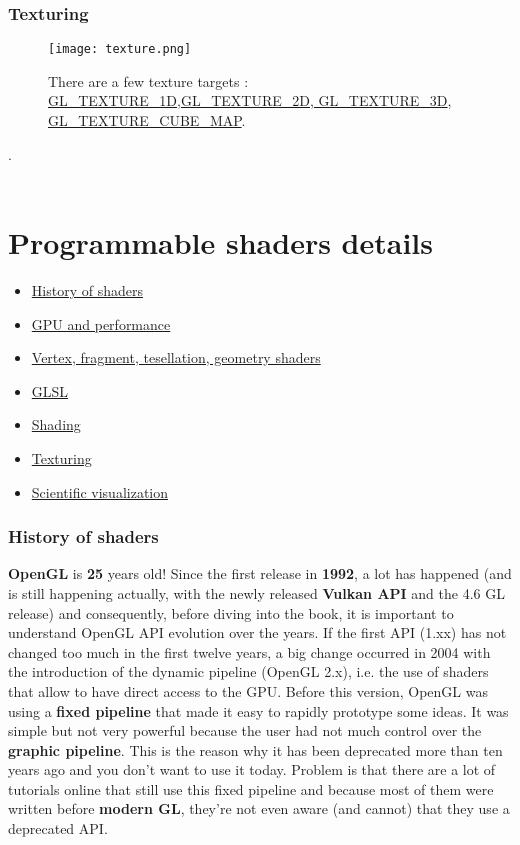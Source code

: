 \documentclass[onecolumn]{article}
\begin{document}
\subsubsection{Texturing }\label{sec:1.0.4}

\begin{figure}[ht!]
\centering
\texttt{[image: texture.png]}
\caption{There are a few texture targets : \url{GL_TEXTURE_1D},\url{GL_TEXTURE_2D},\url{ GL_TEXTURE_3D}, \url{GL_TEXTURE_CUBE_MAP}. \label{}}
\end{figure}

.\\\\
\section{Programmable shaders details}
\label{sec:2}

\begin{itemize}
\color{blue!75!black}
\item \hyperref[sec:2.0.1]{History of shaders}
\item \hyperref[sec:2.0.2]{ GPU and performance}
\item \hyperref[sec:2.0.4]{Vertex, fragment, tesellation, geometry shaders}
\item \hyperref[sec:2.0.5]{GLSL} 
\item \hyperref[sec:2.0.6]{Shading}
\item  \hyperref[sec:2.0.7]{Texturing}
\item \hyperref[sec:2.0.8]{Scientific visualization}
\end{itemize}

\subsubsection{History of shaders}
\label{sec:2.0.1}

\textbf{OpenGL} is \textbf{25} years old! Since the first release in \textbf{1992}, a lot has happened (and is still happening actually, with the newly released\textbf{ Vulkan API }and the 4.6 GL release) and consequently, before diving into the book, it is important to understand OpenGL API evolution over the years. If the first API (1.xx) has not changed too much in the first twelve years, a big change occurred in 2004 with the introduction of the dynamic pipeline (OpenGL 2.x), i.e. the use of shaders that allow to have direct access to the GPU. Before this version, OpenGL was using a\textbf{ fixed pipeline} that made it easy to rapidly prototype some ideas. It was simple but not very powerful because the user had not much control over the\textbf{ graphic pipeline}. This is the reason why it has been deprecated more than ten years ago and you don't want to use it today. Problem is that there are a lot of tutorials online that still use this fixed pipeline and because most of them were written before \textbf{modern GL}, they're not even aware (and cannot) that they use a deprecated API.
\end{document}
